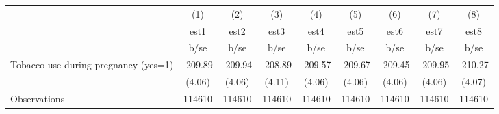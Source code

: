 {
\def\sym#1{\ifmmode^{#1}\else\(^{#1}\)\fi}
\begin{tabular}{l*{8}{c}}
\hline\hline
                                                  &\multicolumn{1}{c}{(1)}&\multicolumn{1}{c}{(2)}&\multicolumn{1}{c}{(3)}&\multicolumn{1}{c}{(4)}&\multicolumn{1}{c}{(5)}&\multicolumn{1}{c}{(6)}&\multicolumn{1}{c}{(7)}&\multicolumn{1}{c}{(8)}\\
                                                  &        est1&        est2&        est3&        est4&        est5&        est6&        est7&        est8\\
                                                  &        b/se&        b/se&        b/se&        b/se&        b/se&        b/se&        b/se&        b/se\\
\hline
Tobacco use during pregnancy (yes=1)              &     -209.89&     -209.94&     -208.89&     -209.57&     -209.67&     -209.45&     -209.95&     -210.27\\
                                                  &      (4.06)&      (4.06)&      (4.11)&      (4.06)&      (4.06)&      (4.06)&      (4.06)&      (4.07)\\
\hline
Observations                                      &      114610&      114610&      114610&      114610&      114610&      114610&      114610&      114610\\
\hline\hline
\end{tabular}
}
